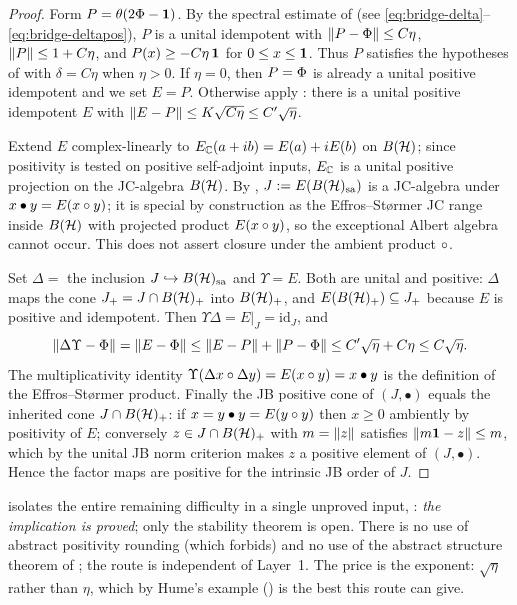 \begin{proof}
Form $P=\theta(2\Phi-\mathbf{1})$. By the spectral estimate of 
(see \eqref{eq:bridge-delta}--\eqref{eq:bridge-deltapos}), $P$ is a unital
idempotent with $\lVert P-\Phi \rVert\le C\eta$, $\lVert P \rVert\le1+C\eta$, and
$P(x)\ge-C\eta\,\mathbf{1}$ for $0\le x\le\mathbf{1}$. Thus $P$ satisfies the hypotheses of
 with $\delta=C\eta$ when $\eta>0$. If $\eta=0$, then
$P=\Phi$ is already a unital positive idempotent and we set $E=P$. Otherwise
apply : there is a unital positive idempotent $E$ with
$\lVert E-P \rVert\le K\sqrt{C\eta}\le C'\sqrt{\eta}$.

Extend $E$ complex-linearly to $E_{\mathbb{C}}(a+ib)=E(a)+iE(b)$ on $B(\mathcal{H})$; since
positivity is tested on positive self-adjoint inputs, $E_{\mathbb{C}}$ is a unital
positive projection on the JC-algebra $B(\mathcal{H})$. By ,
$J:=E(B(\mathcal{H})_{\mathrm{sa}})$ is a JC-algebra under $x\bullet y=E(x\circ y)$; it is special by
construction as the Effros--St\o rmer JC range inside $B(\mathcal{H})$ with projected
product $E(x\circ y)$, so the exceptional Albert algebra cannot occur. This does
not assert closure under the ambient product $\circ$.

Set $\Delta=$ the inclusion $J\hookrightarrow B(\mathcal{H})_{\mathrm{sa}}$ and $\Upsilon=E$. Both are
unital and positive: $\Delta$ maps the cone $J_+=J\cap B(\mathcal{H})_+$ into $B(\mathcal{H})_+$, and
$E(B(\mathcal{H})_+)\subseteq J_+$ because $E$ is positive and idempotent. Then
$\Upsilon\Delta=E|_J=\mathrm{id}_J$, and
\[
  \lVert \Delta\Upsilon-\Phi \rVert=\lVert E-\Phi \rVert
   \le\lVert E-P \rVert+\lVert P-\Phi \rVert\le C'\sqrt\eta+C\eta\le C\sqrt\eta .
\]
The multiplicativity identity $\Upsilon(\Delta x\circ\Delta y)=E(x\circ y)=x\bullet y$
is the definition of the Effros--St\o rmer product. Finally the JB positive cone
of $(J,\bullet)$ equals the inherited cone $J\cap B(\mathcal{H})_+$: if $x=y\bullet y=E(y\circ y)$
then $x\ge0$ ambiently by positivity of $E$; conversely $z\in J\cap B(\mathcal{H})_+$ with
$m=\lVert z \rVert$ satisfies $\lVert m\mathbf{1}-z \rVert\le m$, which by the unital JB
norm criterion makes $z$ a positive element of $(J,\bullet)$. Hence the factor
maps are positive for the intrinsic JB order of $J$.
\end{proof}

 isolates the entire remaining difficulty in a single
unproved input, : \emph{the implication is proved}; only the
stability theorem is open. There is no use of abstract positivity rounding (which
 forbids) and no use of the abstract structure theorem
of ; the route is independent of Layer~1. The price is the
exponent: $\sqrt\eta$ rather than $\eta$, which by Hume's example ()
is the best this route can give.

